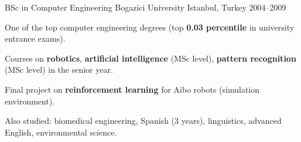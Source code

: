 \begin{cventries}
  \cventry
    {BSc in Computer Engineering} %
    {Bogazici University} %
    {Istanbul, Turkey} %
    {2004--2009} %
    {
      \begin{cvitems} %
        \item {One of the top computer engineering degrees (top \textbf{0.03 percentile} in university entrance exams).}
        \item {Courses on \textbf{robotics}, \textbf{artificial intelligence} (MSc level), \textbf{pattern recognition} (MSc level) in the senior year.}
        \item {Final project on \textbf{reinforcement learning} for Aibo robots (simulation environment).}
        \item {Also studied: biomedical engineering, Spanish (3 years), linguistics, advanced English, environmental science.}
      \end{cvitems}
    }

\end{cventries}

